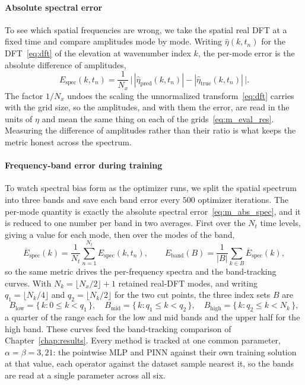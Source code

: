 \paragraph{Absolute spectral error} To see which spatial frequencies are wrong, we take the spatial real DFT at a fixed time and compare amplitudes mode by mode. Writing $\hat\eta(k, t_n)$ for the DFT~\eqref{eq:dft} of the elevation at wavenumber index $k$, the per-mode error is the absolute difference of amplitudes,
\begin{equation}\label{eq:m_abs_spec}
    E_{\text{spec}}(k, t_n)
      = \frac{1}{N_x}\,\bigl| \, |\hat\eta_{\text{pred}}(k,t_n)| - |\hat\eta_{\text{true}}(k,t_n)| \, \bigr|.
\end{equation}
The factor $1/N_x$ undoes the scaling the unnormalized transform~\eqref{eq:dft} carries with the grid size, so the amplitudes, and with them the error, are read in the units of $\eta$ and mean the same thing on each of the grids~\eqref{eq:m_eval_res}. Measuring the difference of amplitudes rather than their ratio is what keeps the metric honest across the spectrum.

\paragraph{Frequency-band error during training} To watch spectral bias form as the optimizer runs, we split the spatial spectrum into three bands and save each band error every $500$ optimizer iterations. The per-mode quantity is exactly the absolute spectral error~\eqref{eq:m_abs_spec}, and it is reduced to one number per band in two averages. First over the $N_t$ time levels, giving a value for each mode, then over the modes of the band,
\begin{equation}\label{eq:m_band_err}
    \overline{E}_{\text{spec}}(k)
      = \frac{1}{N_t} \sum_{n=1}^{N_t} E_{\text{spec}}(k, t_n),
    \qquad
    E_{\text{band}}(B)
      = \frac{1}{|B|} \sum_{k \in B} \overline{E}_{\text{spec}}(k),
\end{equation}
so the same metric drives the per-frequency spectra and the band-tracking curves. With $N_k = \lfloor N_x/2 \rfloor + 1$ retained real-DFT modes, and writing $q_1 = \lfloor N_k/4 \rfloor$ and $q_2 = \lfloor N_k/2 \rfloor$ for the two cut points, the three index sets $B$ are
\begin{equation}\label{eq:m_bands}
    B_{\text{low}} = \bigl\{\, k : 0 \le k < q_1 \,\bigr\},
    \quad
    B_{\text{mid}} = \bigl\{\, k : q_1 \le k < q_2 \,\bigr\},
    \quad
    B_{\text{high}} = \bigl\{\, k : q_2 \le k < N_k \,\bigr\},
\end{equation}
a quarter of the range each for the low and mid bands and the upper half for the high band. These curves feed the band-tracking comparison of Chapter~\ref{chap:results}. Every method is tracked at one common parameter, $\alpha = \beta = 3{,}21$: the pointwise MLP and PINN against their own training solution at that value, each operator against the dataset sample nearest it, so the bands are read at a single parameter across all six.

